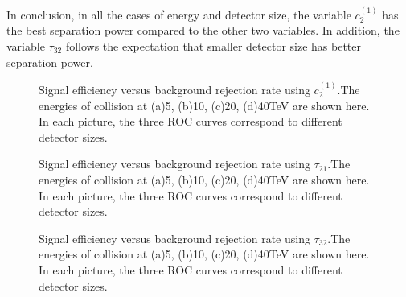 In conclusion, in all the cases of energy and detector size, the variable $c_2^{(1)}$ has the best separation power compared to the other two variables. In addition, the variable $\tau_{32}$ follows the expectation that smaller detector size has better separation power.\\

\label{sec:efficiency}


\begin{figure}
\begin{center}
\end{center}
\caption{Signal efficiency versus background rejection rate using $c_2^{(1)}$.The energies of collision at (a)5, (b)10, (c)20, (d)40TeV are shown here. In each picture, the three ROC curves correspond to different detector sizes.}
\label{fig:cluster_c2b1}
\end{figure}


\begin{figure}
\begin{center}
\end{center}
\caption{Signal efficiency versus background rejection rate using $\tau_{21}$.The energies of collision at (a)5, (b)10, (c)20, (d)40TeV are shown here. In each picture, the three ROC curves correspond to different detector sizes.}
\label{fig:cluster_tau21}
\end{figure}


\begin{figure}
\begin{center}
\end{center}
\caption{Signal efficiency versus background rejection rate using $\tau_{32}$.The energies of collision at (a)5, (b)10, (c)20, (d)40TeV are shown here. In each picture, the three ROC curves correspond to different detector sizes.}
\label{fig:cluster_tau32}
\end{figure}

